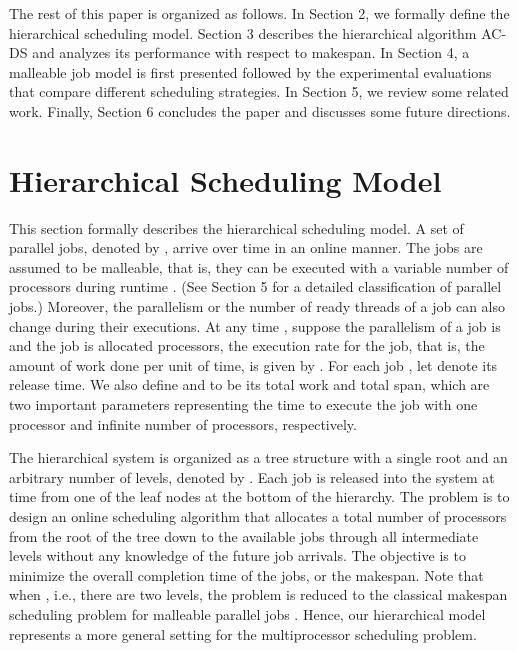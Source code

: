 \documentclass[10pt, a4paper]{article}
\begin{document}
The rest of this paper is organized as follows. In Section 2, we formally define the hierarchical
scheduling model. Section 3 describes the hierarchical algorithm AC-DS and analyzes its performance
with respect to makespan. In Section 4, a malleable job model is first presented followed by the
experimental evaluations that compare different scheduling strategies. In Section 5, we review some
related work. Finally, Section 6 concludes the paper and discusses some future directions.

\section{Hierarchical Scheduling Model}

This section formally describes the hierarchical scheduling model. A set of  parallel jobs,
denoted by , arrive over time in an online manner. The jobs
are assumed to be malleable, that is, they can be executed with a variable number of processors
during runtime \cite{FeitelsonRu98}. (See Section 5 for a detailed classification of parallel
jobs.) Moreover, the parallelism or the number of ready threads of a job can also change during
their executions. At any time , suppose the parallelism of a job  is  and the job
is allocated  processors, the execution rate  for the job, that is, the amount
of work done per unit of time, is given by . For each job
, let  denote its release time. We also define  and  to be its total
work and total span, which are two important parameters representing the time to execute the job
with one processor and infinite number of processors, respectively.

The hierarchical system is organized as a tree structure with a single root and an arbitrary number
of levels, denoted by . Each job  is released into the system at time 
from one of the leaf nodes at the bottom of the hierarchy. The problem is to design an online
scheduling algorithm that allocates a total number of  processors from the root of the tree down
to the available jobs through all intermediate levels without any knowledge of the future job
arrivals. The objective is to minimize the overall completion time of the jobs, or the makespan.
Note that when , i.e., there are two levels, the problem is reduced to the classical
makespan scheduling problem for malleable parallel jobs
\cite{HeHsLe06,SunCaHs11,AgrawalHeHs06,SunHs08}. Hence, our hierarchical model represents a more
general setting for the multiprocessor scheduling problem.
\end{document}
